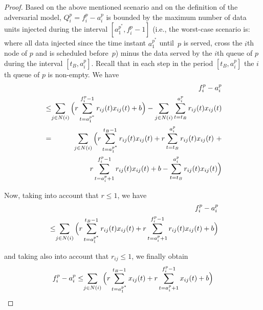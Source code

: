 \documentclass[journal,twocolumn]{./IEEEtran}
\begin{document}
\begin{proof}
Based on the above mentioned scenario and on the definition of the adversarial model, $Q_i^{p}=f_i^{p}-a_i^{p}$ 
is
bounded by the maximum number of data units injected 
during the interval $[a_1^{p^{*}},f_i^p - 1]$ 
(i.e., the worst-case scenario is: where all data injected 
since the
time instant $a_1^{p^{*}}$ until~$p$ is served, cross the $i$th node of $p$ and is scheduled 
before~$p$) 
minus the data served by the $i$th queue of $p$ during the interval $[t_B,a_i^p]$. 
Recall that in each step in the period $[t_B,a_i^p]$ the $i$th queue of $p$ is non-empty.
We have
\begin{eqnarray*}
&&f_i^{p}-a_i^{p} \\
&\leq&  
\hspace*{-1em} \sum_{j \in N(i)} \Big( r \sum_{t=a_1^{p^*}}^{f_i^p - 1}  r_{ij}(t) x_{ij}(t) + b\Big) - \sum_{j \in N(i)} \sum_{t=t_B}^{a_i^p} r_{ij}(t) x_{ij}(t)  \\
&=&  
\hspace*{-1em} \sum_{j \in N(i)} \Big(r \sum_{t=a_1^{p^*}}^{t_B - 1}  r_{ij}(t) x_{ij}(t) + r  \sum_{t=t_B}^{a_i^p}  r_{ij}(t) x_{ij}(t) \ + \\
& & 
\hspace*{-1em} r \sum_{t=a_i^p + 1}^{f_i^p -1}  r_{ij}(t) x_{ij}(t) + b - \sum_{t=t_B}^{a_i^p} r_{ij}(t) x_{ij}(t)\Big)
\end{eqnarray*}

Now, taking into account that  $r \leq 1$, we have
\begin{eqnarray*}
&&f_i^{p}-a_i^{p} \\
&\leq& 
\hspace*{-1em} \sum_{j \in N(i)} \Big(r  \sum_{t=a_1^{p^*}}^{t_B - 1}  r_{ij}(t) x_{ij}(t) +  r \sum_{t=a_i^p + 1}^{f_i^p -1}  r_{ij}(t) x_{ij}(t)+ b\Big)
\end{eqnarray*}

and taking also into account that $r_{ij} \leq 1$, we finally obtain
\begin{eqnarray*}
f_i^{p}-a_i^{p} &\leq& 
\hspace*{-1em} \sum_{j \in N(i)} \Big(r  \sum_{t=a_1^{p^*}}^{t_B - 1}  x_{ij}(t) + r \sum_{t=a_i^p + 1}^{f_i^p -1}  x_{ij}(t)+ b\Big) 
\end{eqnarray*}




\end{proof}
\end{document}
